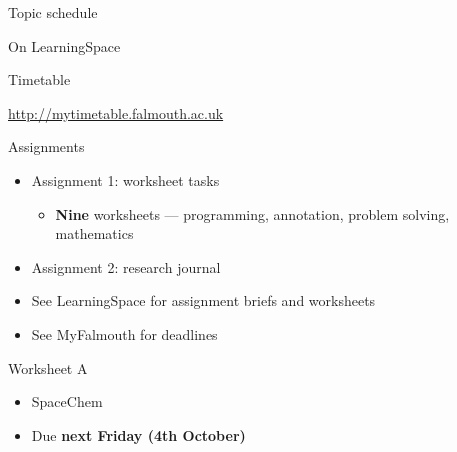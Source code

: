 \begin{frame}{Topic schedule}
	\begin{center}
		On LearningSpace
	\end{center}
\end{frame}

\begin{frame}{Timetable}
	\begin{center}
		\url{http://mytimetable.falmouth.ac.uk}
	\end{center}
\end{frame}

\begin{frame}{Assignments}
	\begin{itemize}
		\pause\item Assignment 1: worksheet tasks
			\begin{itemize}
				\pause\item \textbf{Nine} worksheets --- programming, annotation, problem solving, mathematics
			\end{itemize}
		\pause\item Assignment 2: research journal
		\pause\item See LearningSpace for assignment briefs and worksheets
		\pause\item See MyFalmouth for deadlines
	\end{itemize}
\end{frame}

\begin{frame}{Worksheet A}
	\begin{itemize}
		\item SpaceChem
		\item Due \textbf{next Friday (4th October)}
	\end{itemize}
\end{frame}
